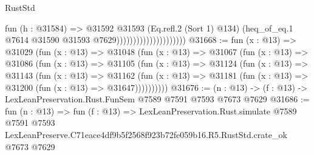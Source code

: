 \begin{lexlean}{RustStd}
\begin{coremodule}
                                          fun (h : @31584) =>
                                          @31592
                                            @31593
                                            (Eq.refl.{2} (Sort 1) @134)
                                            (heq_of_eq.{1}
                                              @7614
                                              @31590
                                              @31593
                                              @7629)))))))))))))))))))))
@31668 := fun (x : @13) =>
  @31029
    (fun (x : @13) =>
    @31048
      (fun (x : @13) =>
      @31067
        (fun (x : @13) =>
        @31086
          (fun (x : @13) =>
          @31105
            (fun (x : @13) =>
            @31124
              (fun (x : @13) =>
              @31143
                (fun (x : @13) =>
                @31162
                  (fun (x : @13) =>
                  @31181 (fun (x : @13) => @31200 (fun (x : @13) => @31647))))))))))
@31676 := (n : @13) -> (f : @13) -> LexLeanPreservation.Rust.FunSem @7589 @7591 @7593 @7673 @7629
@31686 := fun (n : @13) =>
  fun (f : @13) =>
  LexLeanPreservation.Rust.simulate
    @7589
    @7591
    @7593
    LexLeanPreserve.C71eace4df9b5f2568f923b72fe059b16.R5.RustStd.crate_ok
    @7673
    @7629
\end{coremodule}
\end{lexlean}
